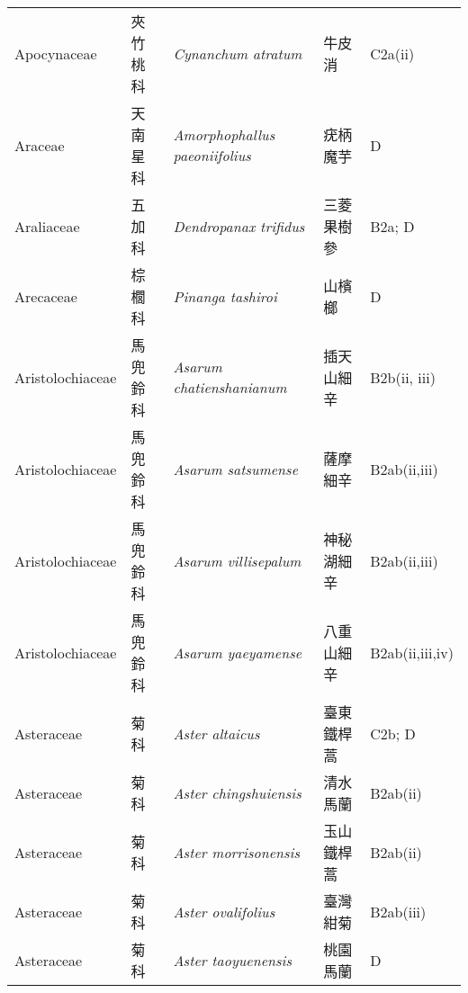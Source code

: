 {\begin{longtable}{p{2.5cm}p{2.5cm}p{4.5cm}p{2.5cm}p{3cm}}
    Apocynaceae & 夾竹桃科 & \textit{Cynanchum atratum}  & 牛皮消 & C2a(ii) \index{Cynanchum@\textit{Cynanchum}!atratum@\textit{atratum}}  \index{牛皮消} \\
    Araceae & 天南星科 & \textit{Amorphophallus paeoniifolius}  & 疣柄魔芋 & D \index{Amorphophallus@\textit{Amorphophallus}!paeoniifolius@\textit{paeoniifolius}}  \index{疣柄魔芋} \\
    Araliaceae & 五加科 & \textit{Dendropanax trifidus}  & 三菱果樹參 & B2a; D \index{Dendropanax@\textit{Dendropanax}!trifidus@\textit{trifidus}}  \index{三菱果樹參} \\
    Arecaceae & 棕櫚科 & \textit{Pinanga tashiroi}  & 山檳榔 & D \index{Pinanga@\textit{Pinanga}!tashiroi@\textit{tashiroi}}  \index{山檳榔} \\
    Aristolochiaceae & 馬兜鈴科 & \textit{Asarum chatienshanianum}  & 插天山細辛 & B2b(ii, iii) \index{Asarum@\textit{Asarum}!chatienshanianum@\textit{chatienshanianum}}  \index{插天山細辛} \\
    Aristolochiaceae & 馬兜鈴科 & \textit{Asarum satsumense}  & 薩摩細辛 & B2ab(ii,iii) \index{Asarum@\textit{Asarum}!satsumense@\textit{satsumense}}  \index{薩摩細辛} \\
    Aristolochiaceae & 馬兜鈴科 & \textit{Asarum villisepalum}  & 神秘湖細辛 & B2ab(ii,iii) \index{Asarum@\textit{Asarum}!villisepalum@\textit{villisepalum}}  \index{神秘湖細辛} \\
    Aristolochiaceae & 馬兜鈴科 & \textit{Asarum yaeyamense}  & 八重山細辛 & B2ab(ii,iii,iv) \index{Asarum@\textit{Asarum}!yaeyamense@\textit{yaeyamense}}  \index{八重山細辛} \\
    Asteraceae & 菊科 & \textit{Aster altaicus}  & 臺東鐵桿蒿 & C2b; D \index{Aster@\textit{Aster}!altaicus@\textit{altaicus}}  \index{臺東鐵桿蒿} \\
    Asteraceae & 菊科 & \textit{Aster chingshuiensis}  & 清水馬蘭 & B2ab(ii) \index{Aster@\textit{Aster}!chingshuiensis@\textit{chingshuiensis}}  \index{清水馬蘭} \\
    Asteraceae & 菊科 & \textit{Aster morrisonensis}  & 玉山鐵桿蒿 & B2ab(ii) \index{Aster@\textit{Aster}!morrisonensis@\textit{morrisonensis}}  \index{玉山鐵桿蒿} \\
    Asteraceae & 菊科 & \textit{Aster ovalifolius}  & 臺灣紺菊 & B2ab(iii) \index{Aster@\textit{Aster}!ovalifolius@\textit{ovalifolius}}  \index{臺灣紺菊} \\
    Asteraceae & 菊科 & \textit{Aster taoyuenensis}  & 桃園馬蘭 & D \index{Aster@\textit{Aster}!taoyuenensis@\textit{taoyuenensis}}  \index{桃園馬蘭} \\

\end{longtable}}
